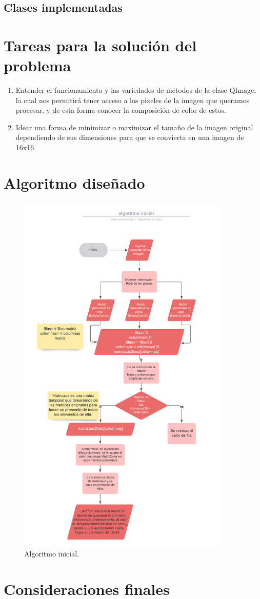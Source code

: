 \documentclass{article}
\begin{document}
\subsection{Clases implementadas}


\section{Tareas para la solución del problema} \label{tareas}
\begin{enumerate}
\item Entender el funcionamiento y las variedades de métodos de la clase QImage, la cual nos permitirá tener acceso a los pixeles de la imagen que queramos procesar, y de esta forma conocer la composición de color de estos.
\item Idear una forma de minimizar o maximizar el tamaño de la imagen original dependiendo de sus dimensiones para que se convierta en una imagen de 16x16


\end{enumerate}

\section{Algoritmo diseñado} \label{algorimo}

\begin{figure}[h]
\includegraphics[width=10cm]{algoritmo.png}
\centering
\caption{Algoritmo inicial.}
\label{fig:algoritmo}
\end{figure}

\section{Consideraciones finales} \label{consideracionesfinales}
\end{document}
